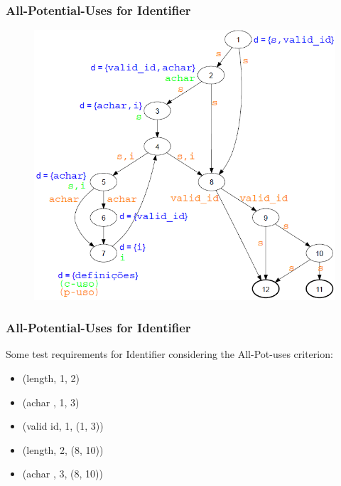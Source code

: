 \begin{frame}[hasprev=false,hasnext=true, c]
\frametitle{All-Potential-Uses for Identifier}
\label{example:identifier-all-pot-uses}

\begin{figure}
	\centering
	\includegraphics[scale=.3]{aux/examples/identifier-all-pot-uses/identifier-java-dug}
\end{figure}
\end{frame}


\begin{frame}[hasprev=true,hasnext=false]
\frametitle{All-Potential-Uses for Identifier}

Some test requirements for Identifier considering the All-Pot-uses criterion:
\begin{itemize}
	\item (length, 1, 2)
	\item (achar , 1, 3)
	\item (valid id, 1, (1, 3))
	\item (length, 2, (8, 10))
	\item (achar , 3, (8, 10))
\end{itemize}

\end{frame}